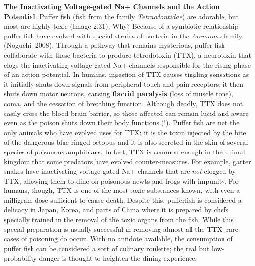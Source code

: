 \documentclass[
]{book}
\begin{document}
\textbf{The Inactivating Voltage-gated Na+ Channels and the Action Potential}. Puffer fish (fish from the family \emph{Tetraodontidae}) are adorable, but most are highly toxic (Image 2.31). Why? Because of a symbiotic relationship puffer fish have evolved with special strains of bacteria in the \emph{Aremonas} family (Noguchi, 2008). Through a pathway that remains mysterious, puffer fish collaborate with these bacteria to produce tetrodotoxin (TTX), a neurotoxin that clogs the inactivating voltage-gated Na+ channels responsible for the rising phase of an action potential. In humans, ingestion of TTX causes tingling sensations as it initially shuts down signals from peripheral touch and pain receptors; it then shuts down motor neurons, causing \textbf{flaccid paralysis }(loss of muscle tone), coma, and the cessation of breathing function. Although deadly, TTX does not easily cross the blood-brain barrier, so those affected can remain lucid and aware even as the poison shuts down their body functions (!). Puffer fish are not the only animals who have evolved uses for TTX: it is the toxin injected by the bite of the dangerous blue-ringed octopus and it is also secreted in the skin of several species of poisonous amphibians. In fact, TTX is common enough in the animal kingdom that some predators have evolved counter-measures. For example, garter snakes have inactivating voltage-gated Na+ channels that are \emph{not} clogged by TTX, allowing them to dine on poisonous newts and frogs with impunity. For humans, though, TTX is one of the most toxic substances known, with even a milligram dose sufficient to cause death. Despite this, pufferfish is considered a delicacy in Japan, Korea, and parts of China where it is prepared by chefs specially trained in the removal of the toxic organs from the fish. While this special preparation is usually successful in removing almost all the TTX, rare cases of poisoning do occur. With no antidote available, the consumption of puffer fish can be considered a sort of culinary roulette; the real but low-probability danger is thought to heighten the dining experience.
\end{document}
